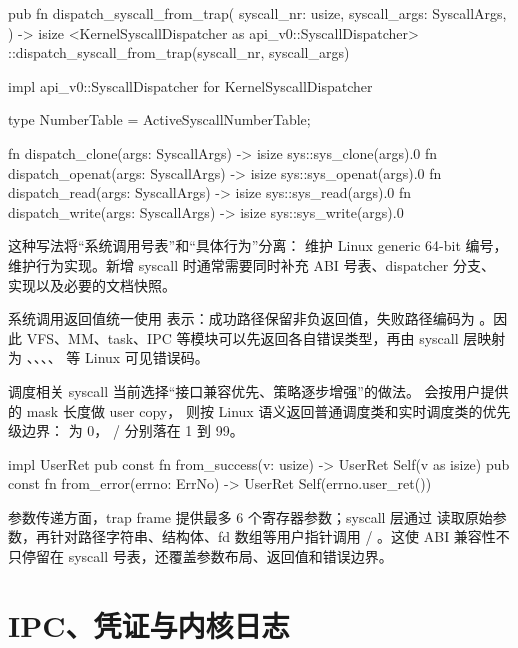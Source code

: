 \begin{rustcode}
pub fn dispatch_syscall_from_trap(
    syscall_nr: usize,
    syscall_args: SyscallArgs,
) -> isize {
    <KernelSyscallDispatcher as api_v0::SyscallDispatcher>
        ::dispatch_syscall_from_trap(syscall_nr, syscall_args)
}

impl api_v0::SyscallDispatcher for KernelSyscallDispatcher {
    type NumberTable = ActiveSyscallNumberTable;

    fn dispatch_clone(args: SyscallArgs) -> isize {
        sys::sys_clone(args).0
    }
    fn dispatch_openat(args: SyscallArgs) -> isize {
        sys::sys_openat(args).0
    }
    fn dispatch_read(args: SyscallArgs) -> isize {
        sys::sys_read(args).0
    }
    fn dispatch_write(args: SyscallArgs) -> isize {
        sys::sys_write(args).0
    }
}
\end{rustcode}

这种写法将“系统调用号表”和“具体行为”分离： 维护 Linux generic 64-bit 编号， 维护行为实现。新增 syscall 时通常需要同时补充 ABI 号表、dispatcher 分支、 实现以及必要的文档快照。


系统调用返回值统一使用  表示：成功路径保留非负返回值，失败路径编码为 。因此 VFS、MM、task、IPC 等模块可以先返回各自错误类型，再由 syscall 层映射为 、、、、 等 Linux 可见错误码。

调度相关 syscall 当前选择“接口兼容优先、策略逐步增强”的做法。 会按用户提供的 mask 长度做 user copy， 则按 Linux 语义返回普通调度类和实时调度类的优先级边界： 为 0， /  分别落在 1 到 99。

\begin{rustcode}
impl UserRet {
    pub const fn from_success(v: usize) -> UserRet {
        Self(v as isize)
    }
    pub const fn from_error(errno: ErrNo) -> UserRet {
        Self(errno.user_ret())
    }
}
\end{rustcode}

参数传递方面，trap frame 提供最多 6 个寄存器参数；syscall 层通过  读取原始参数，再针对路径字符串、结构体、fd 数组等用户指针调用  / 。这使 ABI 兼容性不只停留在 syscall 号表，还覆盖参数布局、返回值和错误边界。

\section{IPC、凭证与内核日志}

